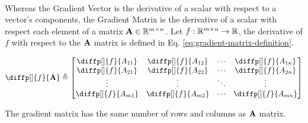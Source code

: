 \documentclass[12pt]{article}
\begin{document}
\\
Whereas the Gradient Vector is the derivative of a scalar with respect to a vector's components, the Gradient Matrix is the derivative of a scalar with respect each element of a matrix $\boldsymbol{\mathbf{A}} \in \mathbb{R}^{m\times n}$. Let $f: \mathbb{R}^{m \times n} \to \mathbb{R}$, the derivative of $f$ with respect to the $\boldsymbol{\mathbf{A}}$ matrix is defined in Eq. \ref{eq:gradient-matrix-definition}.

\renewcommand{\arraystretch}{1.5}
\begin{equation}
    \diffp[]{f}{\mat{A}} \triangleq \begin{bmatrix}
        \diffp[]{f}{A_{11}} & \diffp[]{f}{A_{12}} & \cdots & \diffp[]{f}{A_{1n}} \\
        \diffp[]{f}{A_{21}} & \diffp[]{f}{A_{22}} & \cdots & \diffp[]{f}{A_{2n}} \\
        \vdots & \vdots & \ddots & \vdots \\
        \diffp[]{f}{A_{m1}} & \diffp[]{f}{A_{m2}} & \cdots & \diffp[]{f}{A_{mn}}
    \end{bmatrix}
    \label{eq:gradient-matrix-definition}
\end{equation}
\renewcommand{\arraystretch}{1.0}

The gradient matrix has the same number of rows and columns as $\boldsymbol{\mathbf{A}}$ matrix.
\end{document}
